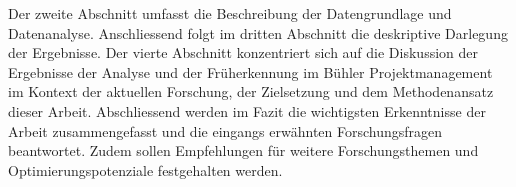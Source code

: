 \newline\newline
Der zweite Abschnitt umfasst die Beschreibung der Datengrundlage und Datenanalyse. Anschliessend folgt im dritten Abschnitt die deskriptive Darlegung der Ergebnisse. Der vierte Abschnitt konzentriert sich auf die Diskussion der Ergebnisse der Analyse und der Früherkennung im Bühler Projektmanagement im Kontext der aktuellen Forschung, der Zielsetzung und dem Methodenansatz dieser Arbeit.
\newline\newline
Abschliessend werden im Fazit die wichtigsten Erkenntnisse der Arbeit zusammengefasst und die eingangs erwähnten Forschungsfragen beantwortet. Zudem sollen Empfehlungen für weitere Forschungsthemen und Optimierungspotenziale festgehalten werden.

	




